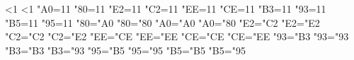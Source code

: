 %
%
%
%
%
\begingroup 			%
\ifx{}\undefined \else
        \ifnum{}<1 \fi\fi<1
  \let\x=\endgroup
\else
  \def\x{\endgroup
%
%
\catcode"A0=11 \catcode"80=11 %
\catcode"E2=11 \catcode"C2=11 %
%
\catcode"EE=11 \catcode"CE=11 %
%
\catcode"B3=11 \catcode"93=11 %
\catcode"B5=11 \catcode"95=11 %
%
\lccode"80="A0 \uccode"80="80  \lccode"A0="A0 \uccode"A0="80 %
\lccode"E2="C2 \uccode"E2="E2  \lccode"C2="C2 \uccode"C2="E2 %
%
\lccode"EE="CE \uccode"EE="EE  \lccode"CE="CE \uccode"CE="EE
%
\lccode"93="B3 \uccode"93="93  \lccode"B3="B3 \uccode"B3="93
\lccode"95="B5 \uccode"95="95  \lccode"B5="B5 \uccode"B5="95
}
\fi
\x

